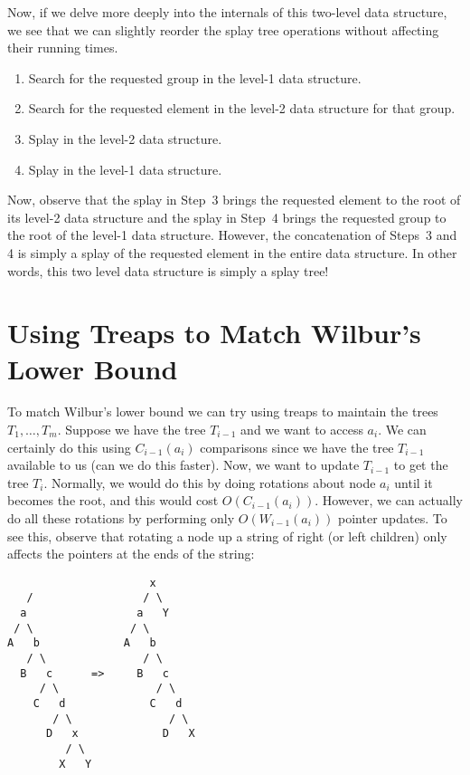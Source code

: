 \documentclass[charterfonts,lotsofwhite]{patmorin}
\begin{document}
Now, if we delve more deeply into the internals of this two-level data
structure, we see that we can slightly reorder the splay tree operations
without affecting their running times.

\begin{enumerate}
\item Search for the requested group in the level-1 data structure.
\item Search for the requested element in the level-2 data structure for that group.
\item Splay in the level-2 data structure.
\item Splay in the level-1 data structure.
\end{enumerate}

Now, observe that the splay in Step~3 brings the requested element to the root
of its level-2 data structure and the splay in Step~4 brings the requested
group to the root of the level-1 data structure.  However, the concatenation of
Steps~3 and 4 is simply a splay of the requested element in the entire data
structure.  In other words, this two level data structure is simply a splay
tree!

\section{Using Treaps to Match Wilbur's Lower Bound}

To match Wilbur's lower bound we can try using treaps to maintain the
trees $T_1,\ldots,T_m$.  Suppose we have the tree $T_{i-1}$ and we
want to access $a_i$.  We can certainly do this using $C_{i-1}(a_i)$
comparisons since we have the tree $T_{i-1}$ available to us (can we
do this faster).  Now, we want to update $T_{i-1}$ to get the tree
$T_i$.  Normally, we would do this by doing rotations about node $a_i$
until it becomes the root, and this would cost $O(C_{i-1}(a_i))$.
However, we can actually do all these rotations by performing only
$O(W_{i-1}(a_i))$ pointer updates.  To see this, observe that rotating
a node up a string of right (or left children) only affects the
pointers at the ends of the string:

\begin{center}
\begin{minipage}{2.5in}
\begin{verbatim}
                      x
   /                 / \
  a                 a   Y
 / \               / \
A   b             A   b
   / \               / \
  B   c      =>     B   c
     / \               / \
    C   d             C   d
       / \               / \
      D   x             D   X
         / \
        X   Y
\end{verbatim}
\end{minipage}
\end{center}
\end{document}
